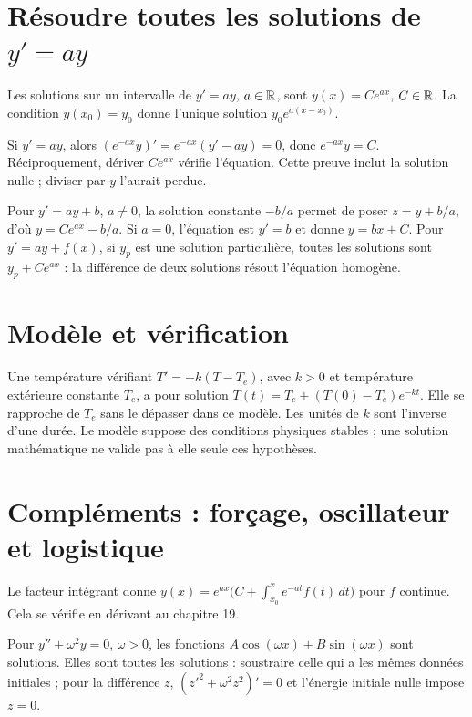 \documentclass[../cours_tle.tex]{subfiles}
\begin{document}
\section{Résoudre toutes les solutions de $y'=ay$}
\begin{theoreme}
Les solutions sur un intervalle de $y'=ay$, $a\in\mathbb{R}$, sont $y(x)=Ce^{ax}$, $C\in\mathbb{R}$.
La condition $y(x_0)=y_0$ donne l'unique solution $y_0e^{a(x-x_0)}$.
\end{theoreme}
\begin{demonstration}
Si $y'=ay$, alors $(e^{-ax}y)'=e^{-ax}(y'-ay)=0$, donc $e^{-ax}y=C$.
Réciproquement, dériver $Ce^{ax}$ vérifie l'équation. Cette preuve inclut la solution nulle ; diviser par $y$ l'aurait perdue.
\end{demonstration}
Pour $y'=ay+b$, $a\ne0$, la solution constante $-b/a$ permet de poser $z=y+b/a$, d'où $y=Ce^{ax}-b/a$.
Si $a=0$, l'équation est $y'=b$ et donne $y=bx+C$.
Pour $y'=ay+f(x)$, si $y_p$ est une solution particulière, toutes les solutions sont $y_p+Ce^{ax}$ : la différence de deux solutions résout l'équation homogène.
\section{Modèle et vérification}
Une température vérifiant $T'=-k(T-T_e)$, avec $k>0$ et température extérieure constante $T_e$, a pour solution
$T(t)=T_e+(T(0)-T_e)e^{-kt}$. Elle se rapproche de $T_e$ sans le dépasser dans ce modèle.
Les unités de $k$ sont l'inverse d'une durée. Le modèle suppose des conditions physiques stables ; une solution mathématique ne valide pas à elle seule ces hypothèses.
\section{Compléments : forçage, oscillateur et logistique}
Le facteur intégrant donne
$y(x)=e^{ax}\bigl(C+\int_{x_0}^x e^{-at}f(t)\,dt\bigr)$ pour $f$ continue.
Cela se vérifie en dérivant au chapitre 19.

Pour $y''+\omega^2y=0$, $\omega>0$, les fonctions $A\cos(\omega x)+B\sin(\omega x)$ sont solutions.
Elles sont toutes les solutions : soustraire celle qui a les mêmes données initiales ; pour la différence $z$, $(z'^2+\omega^2z^2)'=0$ et l'énergie initiale nulle impose $z=0$.
\end{document}
